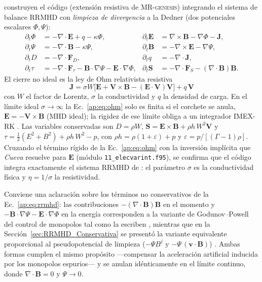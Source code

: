 \primerparrafo \textcite{miranda2014} construyen el código (extensión resistiva de \textsc{MR-genesis}) integrando el sistema de balance RRMHD con \emph{limpieza de divergencia} a la Dedner (dos potenciales escalares $\Phi,\Psi$):
\begin{equation}
\begin{aligned}
\partial_t \Phi &= -\nabla\!\cdot\!\mathbf{E}+q-\kappa\Phi, &
\partial_t \mathbf{E} &= \nabla\times\mathbf{B}-\nabla\Phi-\mathbf{J},\\
\partial_t \Psi &= -\nabla\!\cdot\!\mathbf{B}-\kappa\Psi, &
\partial_t \mathbf{B} &= -\nabla\times\mathbf{E}-\nabla\Psi,\\
\partial_t D &= -\nabla\!\cdot\!\mathbf{F}_D, &
\partial_t q &= -\nabla\!\cdot\!\mathbf{J},\\
\partial_t \tau &= -\nabla\!\cdot\!\mathbf{F}_\tau-\mathbf{B}\!\cdot\!\nabla\Psi
                   -\mathbf{E}\!\cdot\!\nabla\Phi, &
\partial_t \mathbf{S} &= -\nabla\!\cdot\!\mathbf{F}_S-(\nabla\!\cdot\!\mathbf{B})\mathbf{B}.
\end{aligned}
\label{ap:eq:rrmhd}
\end{equation}
El cierre no ideal es la ley de Ohm relativista resistiva
\begin{equation}
\boxed{\;\mathbf{J}=\sigma W\big[\mathbf{E}+\mathbf{V}\times\mathbf{B}
-(\mathbf{E}\!\cdot\!\mathbf{V})\mathbf{V}\big]+q\,\mathbf{V}\;}
\label{ap:eq:ohm}
\end{equation}
con $W$ el factor de Lorentz, $\sigma$ la conductividad y $q$ la densidad de carga. En el límite ideal $\sigma\to\infty$ la Ec.~\eqref{ap:eq:ohm} solo es finita si el corchete se anula, $\mathbf{E}=-\mathbf{V}\times\mathbf{B}$ (MHD ideal); la rigidez de ese límite obliga a un integrador IMEX-RK \parencite{miranda2014,miranda-aranguren-2018}. Las variables conservadas son $D=\rho W$, $\mathbf{S}=\mathbf{E}\times\mathbf{B}+\rho h\,W^2\mathbf{V}$ y $\tau=\tfrac12(E^2+B^2)+\rho h\,W^2-p$, con $\rho h=\rho(1+\varepsilon)+p$ y $\varepsilon=p/[(\Gamma-1)\rho]$. Cruzando el término rígido de la Ec.~\eqref{ap:eq:ohm} con la inversión implícita que \textit{Cueva} resuelve para $\mathbf{E}$ (módulo \texttt{11\_elecvarint.f95}), se confirma que el código integra exactamente el sistema RRMHD de \textcite{miranda2014,miranda-aranguren-2018}: el parámetro $\sigma$ es la conductividad física y $\eta=1/\sigma$ la resistividad.

Conviene una aclaración sobre los términos no conservativos de la Ec.~\eqref{ap:eq:rrmhd}: las contribuciones $-(\nabla\!\cdot\!\mathbf{B})\mathbf{B}$ en el momento y $-\mathbf{B}\!\cdot\!\nabla\Psi-\mathbf{E}\!\cdot\!\nabla\Phi$ en la energía corresponden a la variante de Godunov--Powell del control de monopolos tal como la escriben \textcite{miranda2014}, mientras que en la Sección~\ref{sec:RRMHD_Conservativa} se presentó la variante equivalente proporcional al pseudopotencial de limpieza ($-\Psi B^j$ y $-\Psi\,(\mathbf{v}\cdot\mathbf{B})$) \parencite{ruedaramirez2023}. Ambas formas cumplen el mismo propósito ---compensar la aceleración artificial inducida por los monopolos espurios--- y se anulan idénticamente en el límite continuo, donde $\nabla\!\cdot\!\mathbf{B}=0$ y $\Psi\to0$.

